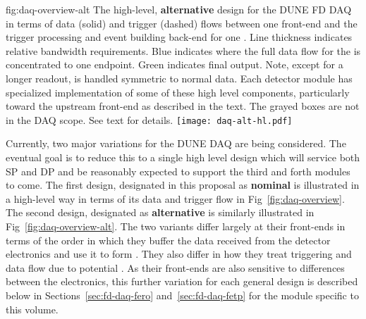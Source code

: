 \begin{dunefigure}{fig:daq-overview-alt}
  {The high-level, \textbf{alternative} design for the DUNE FD DAQ in
    terms of data (solid) and trigger (dashed) flows between one
     front-end and the trigger processing and event
    building back-end for one . 
    Line thickness indicates relative bandwidth requirements.
    Blue indicates where the full data flow for the  is
    concentrated to one endpoint.
    Green indicates final output.
    Note, except for a longer readout,  is handled
    symmetric to normal data.
    Each detector module has specialized implementation of some of
    these high level components, particularly toward the upstream
    front-end as described in the text. 
    The grayed boxes are not in the DAQ scope.
    See text for details.
  }
  \texttt{[image: daq-alt-hl.pdf]}%
\end{dunefigure}

Currently, two major variations for the DUNE DAQ are being considered. 
The eventual goal is to reduce this to a single high level design
which will service both SP and DP  and be reasonably
expected to support the third and forth modules to come.
The first design, designated in this proposal as \textbf{nominal} is
illustrated in a high-level way in terms of its data and trigger flow
in Fig~\ref{fig:daq-overview}. 
The second design, designated as \textbf{alternative} is similarly
illustrated in Fig~\ref{fig:daq-overview-alt}. 
The two variants differ largely at their front-ends in terms of the
order in which they buffer the data received from the detector
electronics and use it to form . 
They also differ in how they treat triggering and data flow due to
potential . 
As their front-ends are also sensitive to differences between the
 electronics, this further variation for each general
design is described below in Sections~\ref{sec:fd-daq-fero}
and~\ref{sec:fd-daq-fetp} for the module specific to this volume.

